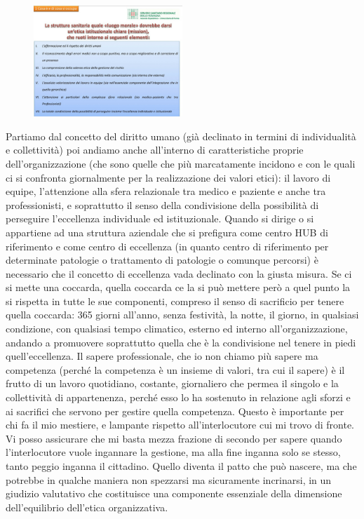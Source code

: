  \begin{figure}[!ht]
\centering
	\includegraphics[width=0.5\textwidth]{32/image6.jpeg}
	\end{figure}

Partiamo dal concetto del diritto umano (già declinato in termini di
individualità e collettività) poi andiamo anche all'interno di
caratteristiche proprie dell'organizzazione (che sono quelle che più
marcatamente incidono e con le quali ci si confronta giornalmente per la
realizzazione dei valori etici): il lavoro di equipe, l'attenzione alla
sfera relazionale tra medico e paziente e anche tra professionisti, e
soprattutto il senso della condivisione della possibilità di perseguire
l'eccellenza individuale ed istituzionale. Quando si dirige o si
appartiene ad una struttura aziendale che si prefigura come centro HUB
di riferimento e come centro di eccellenza (in quanto centro di
riferimento per determinate patologie o trattamento di patologie o
comunque percorsi) è necessario che il concetto di eccellenza vada
declinato con la giusta misura. Se ci si mette una coccarda, quella
coccarda ce la si può mettere però a quel punto la si rispetta in tutte
le sue componenti, compreso il senso di sacrificio per tenere quella
coccarda: 365 giorni all'anno, senza festività, la notte, il giorno, in
qualsiasi condizione, con qualsiasi tempo climatico, esterno ed interno
all'organizzazione, andando a promuovere soprattutto quella che è la
condivisione nel tenere in piedi quell'eccellenza. Il sapere
professionale, che io non chiamo più sapere ma competenza (perché la
competenza è un insieme di valori, tra cui il sapere) è il frutto di un
lavoro quotidiano, costante, giornaliero che permea il singolo e la
collettività di appartenenza, perché esso lo ha sostenuto in relazione
agli sforzi e ai sacrifici che servono per gestire quella competenza.
Questo è importante per chi fa il mio mestiere, e lampante rispetto
all'interlocutore cui mi trovo di fronte. Vi posso assicurare che mi
basta mezza frazione di secondo per sapere quando l'interlocutore vuole
ingannare la gestione, ma alla fine inganna solo se stesso, tanto peggio
inganna il cittadino. Quello diventa il patto che può nascere, ma che
potrebbe in qualche maniera non spezzarsi ma sicuramente incrinarsi, in
un giudizio valutativo che costituisce una componente essenziale della
dimensione dell'equilibrio dell'etica organizzativa.

